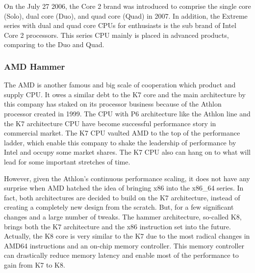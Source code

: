 \documentclass[letterpaper,10pt,compsoc,draftclsnofoot,onecolumn]{IEEEtran}
\begin{document}
On the July 27 2006, the Core 2 brand was introduced to comprise the single core (Solo),  dual core (Duo), and quad core (Quad) in 2007. In addition, the Extreme series with dual and quad core CPUs for enthusiasts is the sub brand of Intel Core 2 processors. This series CPU mainly is placed in advanced products, comparing to the Duo and Quad.

\subsubsection{AMD Hammer}
The AMD is another famous and big scale of cooperation which product and supply CPU. It owes a similar debt to the K7 core and the main architecture by this company has staked on  its processor business because of the Athlon processor created in 1999. The CPU with P6 architecture like the Athlon line and the K7 architecture CPU have become successful performance story in commercial market. The K7 CPU vaulted AMD to the top of the performance ladder,  which enable this company to shake the leadership of performance by Intel and occupy some market shares. The K7 CPU also can hang on to what will lead for some important stretches of time.

However, given the Athlon's continuous performance scaling, it does not have any surprise when AMD hatched the idea of bringing x86 into the x86\_64 series. In fact, both architectures are decided to build on the K7 architecture, instead of creating a completely new design from the scratch\cite{inside_amd_64}. But, for a few significant changes and a large number of tweaks. The hammer architecture, so-called K8, brings both the K7 architecture and the x86 instruction set into the future. Actually, the K8 core is very similar to the K7 due to the most radical changes in AMD64 instructions and an on-chip memory controller. This memory controller can drastically reduce memory latency and enable most of the performance to gain from K7 to K8.
\end{document}
